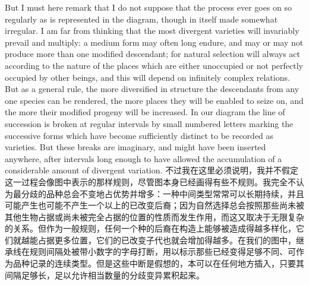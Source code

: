 \darwinpair
{But I must here remark that I do not suppose that the process ever goes on so regularly as is represented in the diagram, though in itself made somewhat irregular. I am far from thinking that the most divergent varieties will invariably prevail and multiply: a medium form may often long endure, and may or may not produce more than one modified descendant; for natural selection will always act according to the nature of the places which are either unoccupied or not perfectly occupied by other beings, and this will depend on infinitely complex relations. But as a general rule, the more diversified in structure the descendants from any one species can be rendered, the more places they will be enabled to seize on, and the more their modified progeny will be increased. In our diagram the line of succession is broken at regular intervals by small numbered letters marking the successive forms which have become sufficiently distinct to be recorded as varieties. But these breaks are imaginary, and might have been inserted anywhere, after intervals long enough to have allowed the accumulation of a considerable amount of divergent variation.}
{不过我在这里必须说明，我并不假定这一过程会像图中表示的那样规则，尽管图本身已经画得有些不规则。我完全不认为最分歧的品种总会不变地占优势并增多：一种中间类型常常可以长期持续，并且可能产生也可能不产生一个以上的已改变后裔；因为自然选择总会按照那些尚未被其他生物占据或尚未被完全占据的位置的性质而发生作用，而这又取决于无限复杂的关系。但作为一般规则，任何一个种的后裔在构造上能够被造成得越多样化，它们就越能占据更多位置，它们的已改变子代也就会增加得越多。在我们的图中，继承线在规则间隔处被带小数字的字母打断，用以标示那些已经变得足够不同、可作为品种记录的连续类型。但是这些中断是假想的，本可以在任何地方插入，只要其间隔足够长，足以允许相当数量的分歧变异累积起来。}

